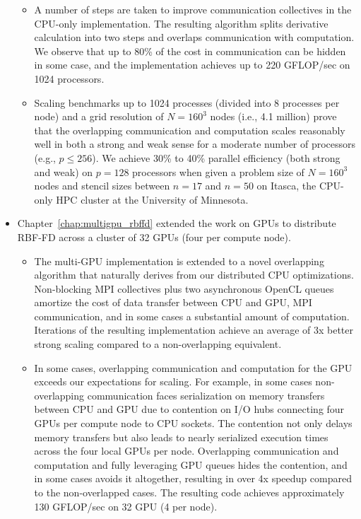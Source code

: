 \begin{itemize}
\begin{itemize}
\item A number of steps are taken to improve communication collectives in the CPU-only implementation. The resulting algorithm splits derivative calculation into two steps and overlaps communication with computation. We observe that up to 80\% of the cost in communication can be hidden in some case, and the implementation achieves up to 220 GFLOP/sec on 1024 processors.

\item Scaling benchmarks up to 1024 processes (divided into 8 processes per node) and a grid resolution of $N=160^3$ nodes (i.e., 4.1 million) prove that the overlapping communication and computation scales reasonably well in both a strong and weak sense for a moderate number of processors (e.g., $p \leq 256$). We achieve 30\% to 40\% parallel efficiency (both strong and weak) on $p=128$ processors when given a problem size of $N=160^3$ nodes and stencil sizes between $n=17$ and $n=50$ on Itasca, the CPU-only HPC cluster at the University of Minnesota. %

\end{itemize} 

\item Chapter~\ref{chap:multigpu_rbffd} extended the work on GPUs to distribute RBF-FD across a cluster of 32 GPUs (four per compute node). %
\begin{itemize} 
\item The multi-GPU implementation is extended to a novel overlapping algorithm that naturally derives from our distributed CPU optimizations. Non-blocking MPI collectives plus two asynchronous OpenCL queues amortize the cost of data transfer between CPU and GPU, MPI communication, and in some cases a substantial amount of computation. Iterations of the resulting implementation achieve an average of 3x better strong scaling compared to a non-overlapping equivalent. 
\item In some cases, overlapping communication and computation for the GPU exceeds our expectations for scaling. For example, in some cases non-overlapping communication faces serialization on memory transfers between CPU and GPU due to contention on I/O hubs connecting four GPUs per compute node to CPU sockets. The contention not only delays memory transfers but also leads to nearly serialized execution times across the four local GPUs per node. Overlapping communication and computation and fully leveraging GPU queues hides the contention, and in some cases avoids it altogether, resulting in over 4x speedup compared to the non-overlapped cases. The resulting code achieves approximately 130 GFLOP/sec on 32 GPU (4 per node).  
\end{itemize} 


\end{itemize}
